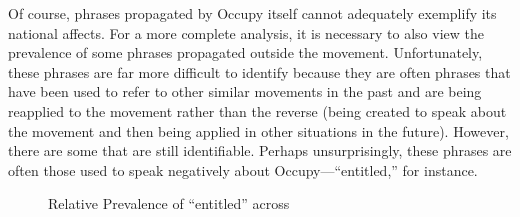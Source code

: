 \documentclass[openany,twoside]{memoir}
\begin{document}
\begin{Spacing}{2}
Of course, phrases propagated by Occupy itself cannot adequately exemplify its national affects.
For a more complete analysis, it is necessary to also view the prevalence of some phrases propagated outside the movement.
Unfortunately, these phrases are far more difficult to identify because they are often phrases that have been used to refer to other similar movements in the past and are being reapplied to the movement rather than the reverse (being created to speak about the movement and then being applied in other situations in the future).
However, there are some that are still identifiable.
Perhaps unsurprisingly, these phrases are often those used to speak negatively about Occupy---``entitled,'' for instance.

\begin{figure}[h]
   \centering
   \caption{Relative Prevalence of ``entitled'' across }
\end{figure}
\end{Spacing}
\end{document}
